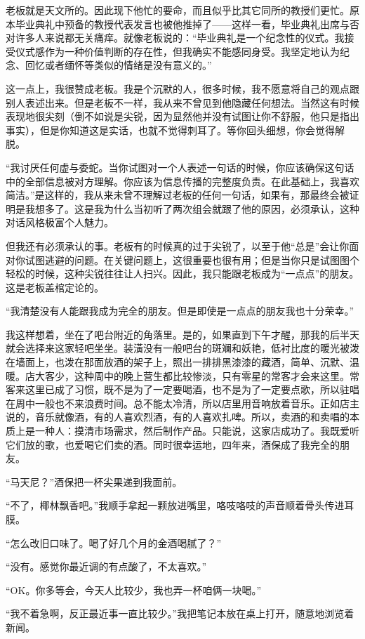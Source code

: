 \documentclass[a4paper, 10pt]{article}
\begin{document}
老板就是天文所的。因此现下他忙的要命，而且似乎比其它同所的教授们更忙。原本毕业典礼中预备的教授代表发言也被他推掉了——这样一看，毕业典礼出席与否对许多人来说都无关痛痒。就像老板说的：“毕业典礼是一个纪念性的仪式。我接受仪式感作为一种价值判断的存在性，但我确实不能感同身受。我坚定地认为纪念、回忆或者缅怀等类似的情绪是没有意义的。”

这一点上，我很赞成老板。我是个沉默的人，很多时候，我不愿意将自己的观点跟别人表述出来。但是老板不一样，我从来不曾见到他隐藏任何想法。当然这有时候表现地很尖刻（倒不如说是尖锐，因为显然他并没有试图让你不舒服，他只是指出事实），但是你知道这是实话，也就不觉得刺耳了。等你回头细想，你会觉得解脱。

“我讨厌任何虚与委蛇。当你试图对一个人表述一句话的时候，你应该确保这句话中的全部信息被对方理解。你应该为信息传播的完整度负责。在此基础上，我喜欢简洁。”是这样的，我从来未曾不理解过老板的任何一句话，如果有，那最终会被证明是我想多了。这是我为什么当初听了两次组会就跟了他的原因，必须承认，这种对话风格极富个人魅力。

但我还有必须承认的事。老板有的时候真的过于尖锐了，以至于他“总是”会让你面对你试图逃避的问题。在关键问题上，这很重要也很有用；但是当你只是试图图个轻松的时候，这种尖锐往往让人扫兴。因此，我只能跟老板成为“一点点”的朋友。这是老板盖棺定论的。

“我清楚没有人能跟我成为完全的朋友。但是即使是一点点的朋友我也十分荣幸。”

我这样想着，坐在了吧台附近的角落里。是的，如果直到下午才醒，那我的后半天就会选择来这家轻吧坐坐。装潢没有一般吧台的斑斓和妖艳，低衬比度的暖光被泼在墙面上，也泼在那面放酒的架子上，照出一排排黑漆漆的藏酒，简单、沉默、温暖。店大客少，这种周中的晚上营生都比较惨淡，只有零星的常客才会来这里。常客来这里已成了习惯，既不是为了一定要喝酒，也不是为了一定要点歌，所以驻唱在周中一般也不来浪费时间。总不能太冷清，所以店里用音响放着音乐。正如店主说的，音乐就像酒，有的人喜欢烈酒，有的人喜欢扎啤。所以，卖酒的和卖唱的本质上是一种人：摸清市场需求，然后制作产品。只能说，这家店成功了。我既爱听它们放的歌，也爱喝它们卖的酒。同时很幸运地，四年来，酒保成了我完全的朋友。

“马天尼？”酒保把一杯尖果递到我面前。

“不了，椰林飘香吧。”我顺手拿起一颗放进嘴里，咯吱咯吱的声音顺着骨头传进耳膜。

“怎么改旧口味了。喝了好几个月的金酒喝腻了？”

“没有。感觉你最近调的有点酸了，不太喜欢。”

“OK。你多等会，今天人比较少，我也弄一杯咱俩一块喝。”

“我不着急啊，反正最近事一直比较少。”我把笔记本放在桌上打开，随意地浏览着新闻。
\end{document}
